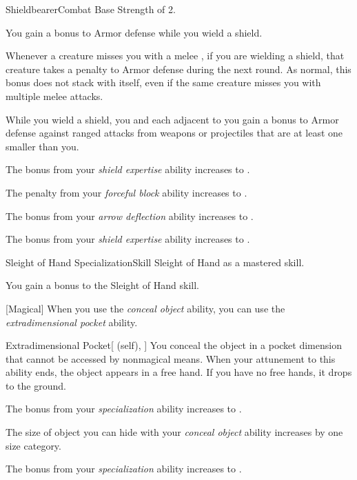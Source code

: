     \begin{feat}{Shieldbearer}{Combat}
        \featpre Base Strength of 2.

         You gain a  bonus to Armor defense while you wield a shield.

         Whenever a creature misses you with a melee , if you are wielding a shield, that creature takes a  penalty to Armor defense during the next round.
        As normal, this bonus does not stack with itself, even if the same creature misses you with multiple melee attacks.

         While you wield a shield, you and each  adjacent to you gain a  bonus to Armor defense against  ranged attacks from weapons or projectiles that are at least one  smaller than you.

         The bonus from your \textit{shield expertise} ability increases to .

         The penalty from your \textit{forceful block} ability increases to .

         The bonus from your \textit{arrow deflection} ability increases to .

         The bonus from your \textit{shield expertise} ability increases to .
    \end{feat}

    \begin{feat}{Sleight of Hand Specialization}{Skill}
        \featpre Sleight of Hand as a mastered skill.

         You gain a  bonus to the Sleight of Hand skill.


        [Magical] When you use the \textit{conceal object} ability, you can use the \textit{extradimensional pocket} ability.
        \begin{attuneability}{Extradimensional Pocket}[ (self), ]
            You conceal the object in a pocket dimension that cannot be accessed by nonmagical means.
            When your attunement to this ability ends, the object appears in a free hand.
            If you have no free hands, it drops to the ground.
        \end{attuneability}

         The bonus from your \textit{specialization} ability increases to .

         The size of object you can hide with your \textit{conceal object} ability increases by one size category.

         The bonus from your \textit{specialization} ability increases to .

    \end{feat}

